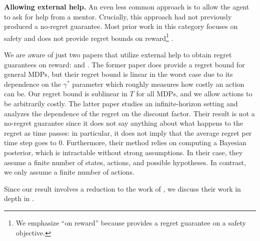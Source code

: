 \textbf{Allowing external help.} An even less common approach is to allow the agent to ask for help from a mentor. Crucially, this approach had not previously produced a no-regret guarantee. Most prior work in this category focuses on safety and does not provide regret bounds on reward\footnote{We emphasize ``on reward'' because \citet{plaut_avoiding_2024} provides a regret guarantee on a safety objective.} \citep{cohen_pessimism_2020, plaut_avoiding_2024}. 

We are aware of just two papers that utilize external help to obtain regret guarantees on reward: \citet{maillard_active_2019} and \citet{kosoy_delegative_2019}. The former paper \citep{maillard_active_2019} does provide a regret bound for general MDPs, but their regret bound is linear in the worst case due to its dependence on the $\gamma^*$ parameter which roughly measures how costly an action can be. Our regret bound is sublinear in $T$ for all MDPs, and we allow actions to be arbitrarily costly. The latter paper \citep{kosoy_delegative_2019} studies an infinite-horizon setting and analyzes the dependence of the regret on the discount factor. Their result is not a no-regret guarantee since it does not say anything about what happens to the regret as time passes: in particular, it does not imply that the average regret per time step goes to 0. Furthermore, their method relies on computing a Bayesian posterior, which is intractable without strong assumptions. In their case, they assume a finite number of states, actions, and possible hypotheses. In contrast, we only assume a finite number of actions.

Since our result involves a reduction to the work of \citet{plaut_avoiding_2024}, we discuss their work in depth in . 